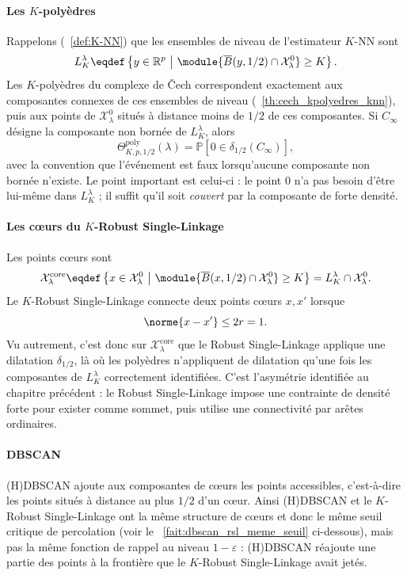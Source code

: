 \paragraph{Les $K$-polyèdres}
Rappelons (\Def~\ref{def:K-NN}) que les ensembles de niveau de l'estimateur $K$-NN sont
\[
    L^\lambda_K
    \eqdef
    \left\{
        y\in\mathbb R^p
        \ \middle|\
        \module{\overline B(y,1/2)\cap\mathcal X_\lambda^0}\ge K
    \right\}.
\]
Les $K$-polyèdres du complexe de \v{C}ech correspondent exactement aux composantes connexes de ces ensembles de niveau (\Th~\ref{th:cech_kpolyedres_knn}), puis aux points de $\mathcal X_\lambda^0$ situés à distance moins de $1/2$ de ces composantes. Si $C_\infty$ désigne la composante non bornée de $L^\lambda_K$, alors
\[
    \Theta^{\mathrm{poly}}_{K,p,1/2}(\lambda)
    =
    \mathbb P\left[
        0\in\delta_{1/2}(C_\infty)
    \right],
\]
avec la convention que l'événement est faux lorsqu'aucune composante non bornée n'existe. Le point important est celui-ci : le point $0$ n'a pas besoin d'être lui-même dans $L^\lambda_K$ ; il suffit qu'il soit \emph{couvert} par la composante de forte densité.

\paragraph{Les cœurs du $K$-Robust Single-Linkage}
Les points cœurs sont
\[
    \mathcal X_\lambda^{\mathrm{core}}
    \eqdef
    \left\{
        x\in\mathcal X_\lambda^0
        \ \middle|\
        \module{\overline B(x,1/2)\cap\mathcal X_\lambda^0}\ge K
    \right\}
    =
    L_K^\lambda\cap\mathcal X_\lambda^0.
\]
Le $K$-Robust Single-Linkage connecte deux points cœurs $x,x'$ lorsque
\[
    \norme{x-x'}\le 2r=1.
\]
Vu autrement, c'est donc sur $\mathcal X_\lambda^{\mathrm{core}}$ que le Robust Single-Linkage applique une dilatation $\delta_{1/2}$, là où les polyèdres n'appliquent de dilatation qu'une fois les composantes de $L_K^\lambda$ correctement identifiées. C'est l'asymétrie identifiée au chapitre précédent : le Robust Single-Linkage impose une contrainte de densité forte pour exister comme sommet, puis utilise une connectivité par arêtes ordinaires.

\paragraph{DBSCAN}
(H)DBSCAN ajoute aux composantes de cœurs les points accessibles, c'est-à-dire les points situés à distance au plus $1/2$ d'un cœur. Ainsi (H)DBSCAN et le $K$-Robust Single-Linkage ont la même structure de cœurs et donc le même seuil critique de percolation (voir le \Fact~\ref{fait:dbscan_rsl_meme_seuil} ci-dessous), mais pas la même fonction de rappel au niveau $1-\varepsilon$ : (H)DBSCAN réajoute une partie des points à la frontière que le $K$-Robust Single-Linkage avait jetés.

